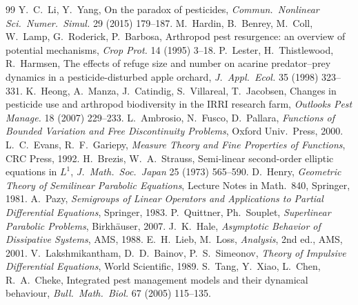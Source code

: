 \documentclass[11pt,a4paper]{article}
\numberwithin{equation}{section}
\theoremstyle{definition}
\theoremstyle{remark}
\begin{document}
\begin{thebibliography}{99}
 Y.~C.~Li, Y.~Yang, On the paradox of pesticides,
\emph{Commun.\ Nonlinear Sci.\ Numer.\ Simul.} 29 (2015) 179--187.
 M.~Hardin, B.~Benrey, M.~Coll, W.~Lamp, G.~Roderick, P.~Barbosa, Arthropod pest
resurgence: an overview of potential mechanisms, \emph{Crop Prot.} 14 (1995) 3--18.
 P.~Lester, H.~Thistlewood, R.~Harmsen, The effects of refuge size and number on
acarine predator--prey dynamics in a pesticide-disturbed apple orchard, \emph{J.\ Appl.\ Ecol.} 35
(1998) 323--331.
 K.~Heong, A.~Manza, J.~Catindig, S.~Villareal, T.~Jacobsen, Changes in pesticide use
and arthropod biodiversity in the IRRI research farm, \emph{Outlooks Pest Manage.} 18 (2007) 229--233.
 L.~Ambrosio, N.~Fusco, D.~Pallara, \emph{Functions of Bounded Variation and Free
Discontinuity Problems}, Oxford Univ.\ Press, 2000.
 L.~C.~Evans, R.~F.~Gariepy, \emph{Measure Theory and Fine Properties of
Functions}, CRC Press, 1992.
 H.~Brezis, W.~A.~Strauss, Semi-linear second-order elliptic equations in
$L^1$, \emph{J.\ Math.\ Soc.\ Japan} 25 (1973) 565--590.
 D.~Henry, \emph{Geometric Theory of Semilinear Parabolic Equations}, Lecture Notes in
Math.\ 840, Springer, 1981.
 A.~Pazy, \emph{Semigroups of Linear Operators and Applications to Partial Differential
Equations}, Springer, 1983.
 P.~Quittner, Ph.~Souplet, \emph{Superlinear Parabolic Problems}, Birkhäuser, 2007.
 J.~K.~Hale, \emph{Asymptotic Behavior of Dissipative Systems}, AMS, 1988.
 E.~H.~Lieb, M.~Loss, \emph{Analysis}, 2nd ed., AMS, 2001.
 V.~Lakshmikantham, D.~D.~Bainov, P.~S.~Simeonov, \emph{Theory of Impulsive
Differential Equations}, World Scientific, 1989.
 S.~Tang, Y.~Xiao, L.~Chen, R.~A.~Cheke, Integrated pest management models and their
dynamical behaviour, \emph{Bull.\ Math.\ Biol.} 67 (2005) 115--135.
\end{thebibliography}
\end{document}
